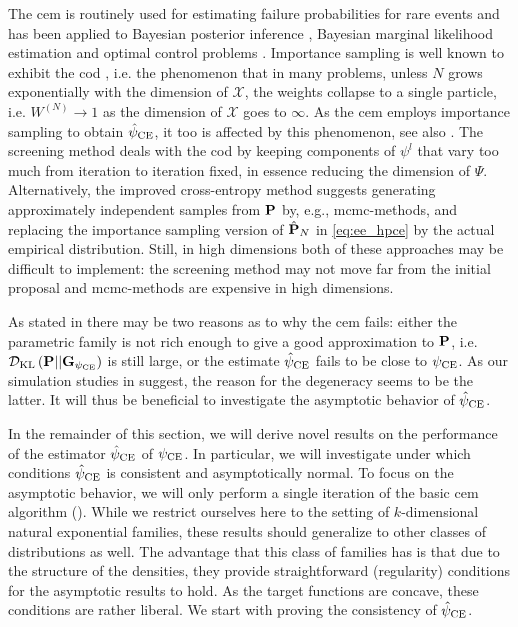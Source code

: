 The \gls{cem} is routinely used for estimating failure probabilities for rare events \citep{Homem-de-Mello2007Study} and has been applied to Bayesian posterior inference \citep{Engel2023Bayesian,Ehre2023Certified}, Bayesian marginal likelihood estimation \citep{Chan2012Marginal} and optimal control problems \citep{Kappen2016Adaptive,Zhang2014Applications}.
Importance sampling is well known to exhibit the \gls{cod} \citep{Bengtsson2008Curseofdimensionality}, i.e. the phenomenon that in many problems, unless $N$ grows exponentially with the dimension of $\mathcal X$, the weights collapse to a single particle, i.e. $W^{(N)} \to 1$ as the dimension of $\mathcal X$ goes to $\infty$. As the \gls{cem} employs importance sampling to obtain $\hpce$, it too is affected by this phenomenon, see also . 
The screening method \citep{Rubinstein2009How} deals with the \gls{cod} by keeping components of $\psi^{l}$ that vary too much from iteration to iteration fixed, in essence reducing the dimension of $\Psi$. 
Alternatively, the improved cross-entropy method \citep{Chan2012Improved} suggests generating approximately independent samples from $\P$ by, e.g., \gls{mcmc}-methods, and replacing the importance sampling version of $\hat\P_{N}$  in \eqref{eq:ee_hpce} by the actual empirical distribution.
Still, in high dimensions both of these approaches may be difficult to implement: the screening method may not move far from the initial proposal and \gls{mcmc}-methods are expensive in high dimensions.


As stated in \citep{Chan2012Improved} there may be two reasons as to why the \gls{cem} fails: either the parametric family is not rich enough to give a good approximation to $\P$, i.e. $ \Dkl{\P}{\G_{\pce}}$ is still large, or the estimate $\hpce$ fails to be close to $\pce$. As our simulation studies in  suggest, the reason for the degeneracy seems to be the latter. It will thus be beneficial to investigate the asymptotic behavior of $\hpce$. 

In the remainder of this section, we will derive novel results on the performance of the estimator $\hpce$ of $\pce$. In particular, we will investigate under which conditions $\hpce$ is consistent and asymptotically normal. To focus on the asymptotic behavior, we will only perform a single iteration of the basic \gls{cem} algorithm (). While we restrict ourselves here to the setting of $k$-dimensional natural exponential families, these results should generalize to other classes of distributions as well. The advantage that this class of families has is that due to the structure of the densities, they provide straightforward (regularity) conditions for the asymptotic results to hold. As the target functions are concave, these conditions are rather liberal. We start with proving the consistency of $\hpce$. 

